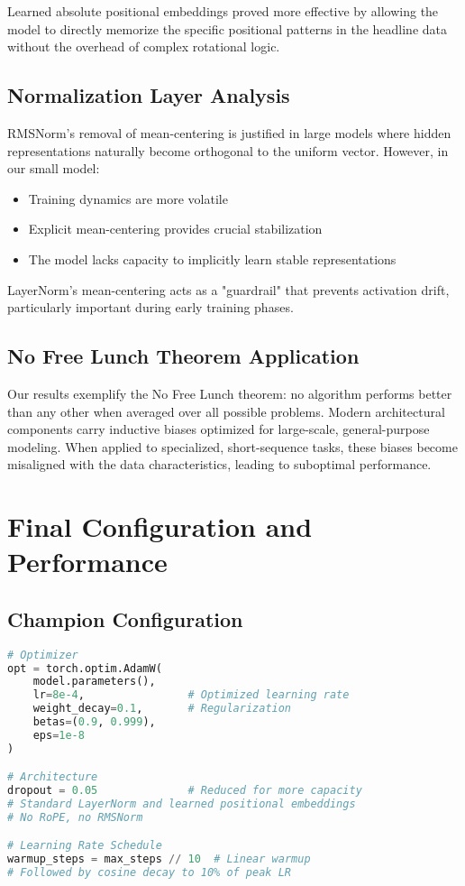 \documentclass[11pt,a4paper]{article}
\begin{document}
Learned absolute positional embeddings proved more effective by allowing the model to directly memorize the specific positional patterns in the headline data without the overhead of complex rotational logic.

\subsection{Normalization Layer Analysis}
RMSNorm's removal of mean-centering is justified in large models where hidden representations naturally become orthogonal to the uniform vector. However, in our small model:

\begin{itemize}
    \item Training dynamics are more volatile
    \item Explicit mean-centering provides crucial stabilization
    \item The model lacks capacity to implicitly learn stable representations
\end{itemize}

LayerNorm's mean-centering acts as a "guardrail" that prevents activation drift, particularly important during early training phases.

\subsection{No Free Lunch Theorem Application}
Our results exemplify the No Free Lunch theorem: no algorithm performs better than any other when averaged over all possible problems. Modern architectural components carry inductive biases optimized for large-scale, general-purpose modeling. When applied to specialized, short-sequence tasks, these biases become misaligned with the data characteristics, leading to suboptimal performance.

\section{Final Configuration and Performance}

\subsection{Champion Configuration}
\begin{lstlisting}[language=Python, caption=Final Hyperparameters]
# Optimizer
opt = torch.optim.AdamW(
    model.parameters(),
    lr=8e-4,                # Optimized learning rate
    weight_decay=0.1,       # Regularization
    betas=(0.9, 0.999),
    eps=1e-8
)

# Architecture
dropout = 0.05              # Reduced for more capacity
# Standard LayerNorm and learned positional embeddings
# No RoPE, no RMSNorm

# Learning Rate Schedule
warmup_steps = max_steps // 10  # Linear warmup
# Followed by cosine decay to 10% of peak LR
\end{lstlisting}
\end{document}
